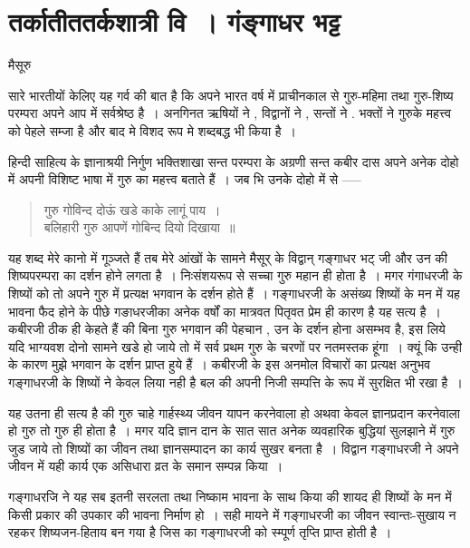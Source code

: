 {\fontsize{15}{17}\selectfont
\chapter{तर्कातीततर्कशात्री वि~। गंङ्गाधर भट्ट}

\begin{center}
\smallskip
मैसूरु
\addrule
\end{center}
सारे भारतीयों केलिए यह गर्व की बात है कि अपने भारत वर्ष में प्राचीनकाल से गुरु-महिमा तथा गुरु-शिष्य परम्परा अपने आप में सर्वश्रेष्ठ है~। अनगिनत ऋषियों ने , विद्वानों ने , सन्तों ने . भक्तों ने गुरुके महत्त्व को पेहले सम्जा है और बाद मे विशद रूप मे शब्दबद्ध भी किया है~। 

हिन्दी साहित्य के ज्ञानाश्रयी निर्गुण भक्तिशाखा सन्त परम्परा के अग्रणी सन्त कबीर दास अपने अनेक दोहो में अपनी विशिष्ट भाषा में गुरु का महत्त्व बताते हैं~। जब भि उनके दोहो में से ----- 
\begin{verse}
गुरु गोविन्द दोऊं खडे काके लागूं पाय~।\\	
बलिहारी गुरु आपणें गोबिन्द दियो दिखाया~॥
\end{verse}
यह शब्द मेरे कानो में गूञ्जते हैं तब मेरे आंखों के सामने मैसूर् के विद्वान् गङ्गाधर भट् जी और उन की शिष्यपरम्परा का दर्शन होने लगता है~। निःसंशयरूप से सच्चा गुरु महान ही होता है~। मगर गंगाधरजी के शिष्यों को तो अपने गुरु में प्रत्यक्ष भगवान के दर्शन होते हैं~। गङ्गाधरजी के असंख्य शिष्यों के मन में यह भावना फैद होने के पीछे गङाधरजीका अनेक वर्षों का मात्रवत पितृवत प्रेम ही कारण है यह सत्य है~। कबीरजी ठीक ही केहते हैं की बिना गुरु भगवान की पेहचान , उन के दर्शन होना असम्भव है, इस लिये यदि भाग्यवश दोनो सामने खडे हो जाये तो में सर्व  प्रथम गुरु के चरणों पर नतमस्तक हूंगा~। क्यूं कि उन्ही के कारण मुझे भगवान के दर्शन प्राप्त हुये हैं~। कबीरजी के इस अनमोल विचारों का प्रत्यक्ष अनुभव गङ्गाधरजी के शिष्यों ने केवल लिया नही है बल की अपनी निजी सम्पत्ति के रूप में सुरक्षित भी रखा है~। 

यह उतना ही सत्य है की गुरु चाहे गार्हस्थ्य जीवन यापन करनेवाला हो अथवा केवल ज्ञानप्रदान करनेवाला हो गुरु तो गुरु ही होता है~। मगर यदि ज्ञान दान के सात सात अनेक व्यवहारिक बुद्धियां सुलझाने में गुरु जुड जाये तो शिष्यों का जीवन तथा ज्ञानसम्पादन का कार्य सुखर बनता है~। विद्वान गङ्गाधरजी ने अपने जीवन में यही कार्य एक असिधारा व्रत के समान सम्पन्न किया~। 

गङ्गाधरजि ने यह सब इतनी सरलता तथा निष्काम भावना के साथ किया की शायद ही शिष्यों के मन में किसी प्रकार की उपकार की भावना निर्माण हो~। सही मायने में गङ्गाधरजी का जीवन स्वान्तः-सुखाय न रहकर शिष्यजन-हिताय बन गया है जिस का गङ्गाधरजी को स्म्पूर्ण तृप्ति प्राप्त होती है~।

}
